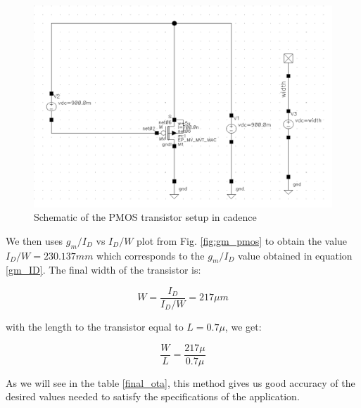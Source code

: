 \begin{figure}[H]
\centering
\includegraphics[scale = 0.45]{images/gm_id_pmos_schem.png}
\caption{Schematic of the PMOS transistor setup in cadence}
\label{pmos_setup}
\end{figure}

We then uses $g_m/I_D$ vs $I_D/W$ plot from Fig. \ref{fig:gm_pmos} to obtain the value $I_D/W = 230.137mm$ which corresponds to the $g_m/I_D$ value obtained in equation \ref{gm_ID}. The final width of the transistor is:

\begin{equation}
    W = \frac{I_D}{I_D/W} = 217\mu m
\end{equation}

with the length to the transistor equal to $L = 0.7\mu$, we get:

\begin{equation}
\frac{W}{L} = \frac{217\mu}{0.7\mu} 
\end{equation}


As we will see in the table \ref{final_ota}, this method gives us good accuracy of the desired values needed to satisfy the specifications of the application.


